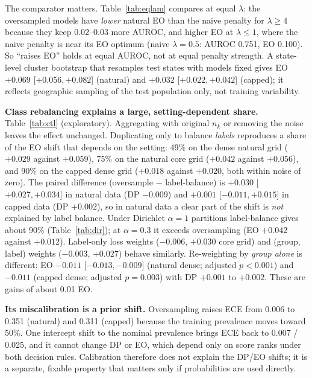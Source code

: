 The comparator matters. Table~\ref{tab:eqlam} compares at equal $\lambda$: the oversampled models have \emph{lower} natural EO than the naive penalty for $\lambda\ge4$ because they keep 0.02--0.03 more AUROC, and higher EO at $\lambda\le1$, where the naive penalty is near its EO optimum (naive $\lambda{=}0.5$: AUROC 0.751, EO 0.100). So ``raises EO'' holds at equal AUROC, not at equal penalty strength. A state-level cluster bootstrap that resamples test states with models fixed gives EO $+0.069$ [$+0.056,+0.082$] (natural) and $+0.032$ [$+0.022,+0.042$] (capped); it reflects geographic sampling of the test population only, not training variability.

\begin{table}[t]
\centering
\caption{Equal-$\lambda$ comparison, oversample vs.\ naive intersectional penalty, logistic regression, 20 seeds. $\Delta$EO is the paired difference [95\% CI].}
\label{tab:eqlam}
\footnotesize
\resizebox{\columnwidth}{!}{}
\end{table}

\textbf{Class rebalancing explains a large, setting-dependent share.} Table~\ref{tab:ctl} (exploratory). Aggregating with original $n_k$ or removing the noise leaves the effect unchanged. Duplicating only to balance \emph{labels} reproduces a share of the EO shift that depends on the setting: 49\% on the dense natural grid ($+0.029$ against $+0.059$), 75\% on the natural core grid ($+0.042$ against $+0.056$), and 90\% on the capped dense grid ($+0.018$ against $+0.020$, both within noise of zero). The paired difference (oversample $-$ label-balance) is $+0.030$ [$+0.027,+0.034$] in natural data (DP $-0.009$) and $+0.001$ [$-0.011,+0.015$] in capped data (DP $+0.002$), so in natural data a clear part of the shift is \emph{not} explained by label balance. Under Dirichlet $\alpha{=}1$ partitions label-balance gives about 90\% (Table~\ref{tab:dir}); at $\alpha{=}0.3$ it exceeds oversampling (EO $+0.042$ against $+0.012$). Label-only loss weights ($-0.006$, $+0.030$ core grid) and (group, label) weights ($-0.003$, $+0.027$) behave similarly. Re-weighting by \emph{group alone} is different: EO $-0.011$ [$-0.013,-0.009$] (natural dense; adjusted $p<0.001$) and $-0.011$ (capped dense; adjusted $p=0.003$) with DP $+0.001$ to $+0.002$. These are gains of about 0.01 EO.

\textbf{Its miscalibration is a prior shift.} Oversampling raises ECE from 0.006 to 0.351 (natural) and 0.311 (capped) because the training prevalence moves toward 50\%. One intercept shift to the nominal prevalence brings ECE back to 0.007 / 0.025, and it cannot change DP or EO, which depend only on score ranks under both decision rules. Calibration therefore does not explain the DP/EO shifts; it is a separate, fixable property that matters only if probabilities are used directly.

